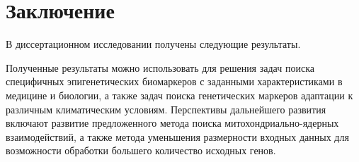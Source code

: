 \chapter*{Заключение}                       %


В диссертационном исследовании получены следующие результаты.

Полученные результаты можно использовать для решения задач поиска специфичных эпигенетических биомаркеров с заданными характеристиками в медицине и биологии, а также задач поиска генетических маркеров адаптации к различным климатическим условиям. Перспективы дальнейшего развития включают развитие предложенного метода поиска митохондриально-ядерных взаимодействий, а также метода уменьшения размерности входных данных для возможности обработки большего количество исходных генов.
